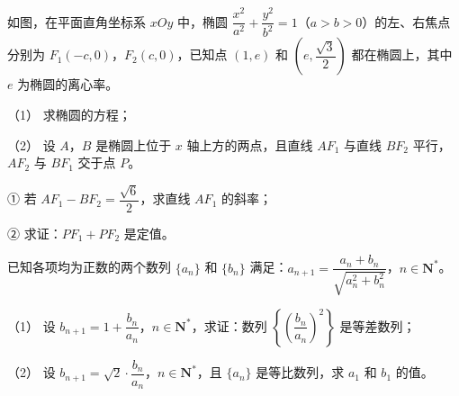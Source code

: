 \begin{question}
如图，在平面直角坐标系 $xOy$ 中，椭圆 $\dfrac{x^2}{a^2}+\dfrac{y^2}{b^2}=1$（$a>b>0$）的左、右焦点分别为 $F_1(-c,0)$，$F_2(c,0)$，已知点 $(1,e)$ 和 $\left(e,\dfrac{\sqrt3}{2}\right)$ 都在椭圆上，其中 $e$ 为椭圆的离心率。

（1） 求椭圆的方程；

（2） 设 $A$，$B$ 是椭圆上位于 $x$ 轴上方的两点，且直线 $AF_1$ 与直线 $BF_2$ 平行，$AF_2$ 与 $BF_1$ 交于点 $P$。

① 若 $AF_1-BF_2=\dfrac{\sqrt6}{2}$，求直线 $AF_1$ 的斜率；

② 求证：$PF_1+PF_2$ 是定值。
\nopagebreak[4]
\begin{center}\end{center}
\nopagebreak[4]
\end{question}
\begin{question}
已知各项均为正数的两个数列 $\{a_n\}$ 和 $\{b_n\}$ 满足：$a_{n+1}=\dfrac{a_n+b_n}{\sqrt{a_n^2+b_n^2}}$，$n\in\mathbf N^*$。

（1） 设 $b_{n+1}=1+\dfrac{b_n}{a_n}$，$n\in\mathbf N^*$，求证：数列 $\left\{\left(\dfrac{b_n}{a_n}\right)^2\right\}$ 是等差数列；

（2） 设 $b_{n+1}=\sqrt2\cdot\dfrac{b_n}{a_n}$，$n\in\mathbf N^*$，且 $\{a_n\}$ 是等比数列，求 $a_1$ 和 $b_1$ 的值。

\end{question}

